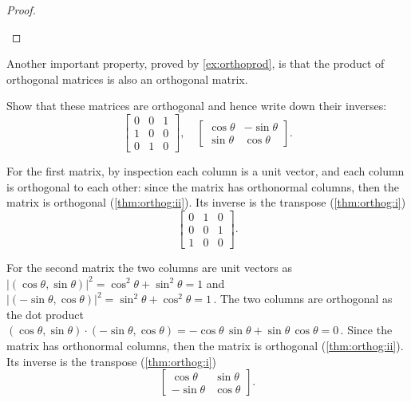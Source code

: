 \begin{proof}
\begin{description}
\end{description}
\end{proof}


Another important property,  proved by \autoref{ex:orthoprod}, is that the product of orthogonal matrices is also an orthogonal matrix.

\begin{example} \label{eg:}
Show that these matrices are orthogonal and hence write down their inverses:
\begin{equation*}
\begin{bmatrix} 0&0&1\\1&0&0\\0&1&0 \end{bmatrix},\quad
\begin{bmatrix} \cos\theta&-\sin\theta\\\sin\theta&\cos\theta \end{bmatrix}.
\end{equation*}

\begin{solution} 
For the first matrix, by inspection each column is a unit vector, and each column is orthogonal to each other: since the matrix has orthonormal columns, then the matrix is orthogonal (\autoref{thm:orthog:ii}).
Its inverse is the transpose (\autoref{thm:orthog:i})
\begin{equation*}
\begin{bmatrix} 0&1&0\\0&0&1\\1&0&0 \end{bmatrix}.
\end{equation*}

For the second matrix the two columns are unit vectors as
\(|(\cos\theta,\sin\theta)|^2=\cos^2\theta+\sin^2\theta=1\) and \(|(-\sin\theta,\cos\theta)|^2=\sin^2\theta+\cos^2\theta=1\)\,.
The two columns are orthogonal as the dot product \((\cos\theta,\sin\theta)\cdot(-\sin\theta,\cos\theta)=-\cos\theta\,\sin\theta+\sin\theta\,\cos\theta=0\)\,.  
Since the matrix has orthonormal columns, then the matrix is orthogonal (\autoref{thm:orthog:ii}).
Its inverse is the transpose (\autoref{thm:orthog:i})
\begin{equation*}
\begin{bmatrix} \cos\theta&\sin\theta\\-\sin\theta&\cos\theta \end{bmatrix}.
\end{equation*}
\end{solution}
\end{example}




